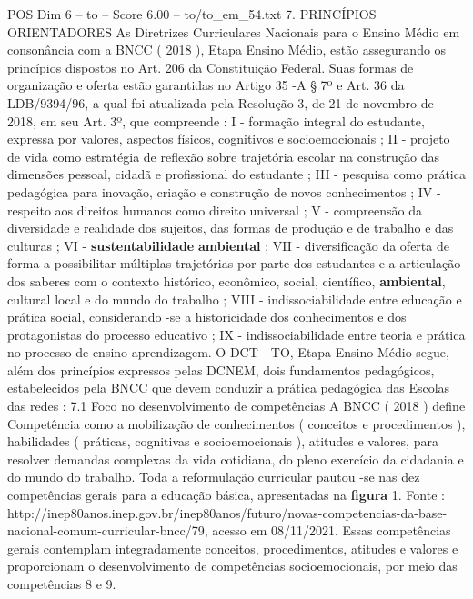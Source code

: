 \begin{textsample}{POS Dim 6 – to – Score 6.00 – to/to\_em\_54.txt}  \label{ex:f6_pos_179}
7.
PRINCÍPIOS ORIENTADORES As Diretrizes Curriculares Nacionais para o Ensino Médio em consonância com a BNCC ( 2018 ), Etapa Ensino Médio, estão assegurando os princípios dispostos no Art. 206 da Constituição Federal.
Suas formas de organização e oferta estão garantidas no Artigo 35 -A § 7º e Art. 36 da LDB/9394/96, a qual foi atualizada pela Resolução 3, de 21 de novembro de 2018, em seu Art. 3º, que compreende : I - formação integral do estudante, expressa por valores, aspectos físicos, cognitivos e socioemocionais ; II - projeto de vida como estratégia de reflexão sobre trajetória escolar na construção das dimensões pessoal, cidadã e profissional do estudante ; III - pesquisa como prática pedagógica para inovação, criação e construção de novos conhecimentos ; IV - respeito aos direitos humanos como direito universal ; V - compreensão da diversidade e realidade dos sujeitos, das formas de produção e de trabalho e das culturas ; VI - \textbf{sustentabilidade} \textbf{ambiental} ; VII - diversificação da oferta de forma a possibilitar múltiplas trajetórias por parte dos estudantes e a articulação dos saberes com o contexto histórico, econômico, social, científico, \textbf{ambiental}, cultural local e do mundo do trabalho ; VIII - indissociabilidade entre educação e prática social, considerando -se a historicidade dos conhecimentos e dos protagonistas do processo educativo ; IX - indissociabilidade entre teoria e prática no processo de ensino-aprendizagem.
O DCT - TO, Etapa Ensino Médio segue, além dos princípios expressos pelas DCNEM, dois fundamentos pedagógicos, estabelecidos pela BNCC que devem conduzir a prática pedagógica das Escolas das redes : 7.1 Foco no desenvolvimento de competências A BNCC ( 2018 ) define Competência como a mobilização de conhecimentos ( conceitos e procedimentos ), habilidades ( práticas, cognitivas e socioemocionais ), atitudes e valores, para resolver demandas complexas da vida cotidiana, do pleno exercício da cidadania e do mundo do trabalho.
Toda a reformulação curricular pautou -se nas dez competências gerais para a educação básica, apresentadas na \textbf{figura} 1.
Fonte : http://inep80anos.inep.gov.br/inep80anos/futuro/novas-competencias-da-base-nacional-comum-curricular-bncc/79, acesso em 08/11/2021.
Essas competências gerais contemplam integradamente conceitos, procedimentos, atitudes e valores e proporcionam o desenvolvimento de competências socioemocionais, por meio das competências 8 e 9.

\end{textsample}
